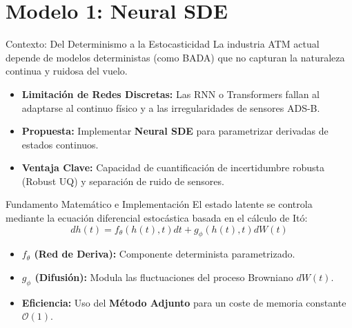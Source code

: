 \documentclass[aspectratio=169]{beamer}
\begin{document}
\section{Modelo 1: Neural SDE}

\begin{frame}{Contexto: Del Determinismo a la Estocasticidad}
  La industria ATM actual depende de modelos deterministas (como BADA) que no capturan la naturaleza continua y ruidosa del vuelo.
  \begin{itemize}
    \item \textbf{Limitación de Redes Discretas:} Las RNN o Transformers fallan al adaptarse al continuo físico y a las irregularidades de sensores ADS-B.
    \item \textbf{Propuesta:} Implementar \textbf{Neural SDE} para parametrizar derivadas de estados continuos.
    \item \textbf{Ventaja Clave:} Capacidad de cuantificación de incertidumbre robusta (Robust UQ) y separación de ruido de sensores.
  \end{itemize}
\end{frame}

\begin{frame}{Fundamento Matemático e Implementación}
  El estado latente se controla mediante la ecuación diferencial estocástica basada en el cálculo de Itó:
  \begin{equation}
    dh(t) = f_{\theta}(h(t),t)dt + g_{\phi}(h(t),t)dW(t)
  \end{equation}
  \begin{itemize}
    \item \textbf{$f_{\theta}$ (Red de Deriva):} Componente determinista parametrizado.
    \item \textbf{$g_{\phi}$ (Difusión):} Modula las fluctuaciones del proceso Browniano $dW(t)$.
    \item \textbf{Eficiencia:} Uso del \textbf{Método Adjunto} para un coste de memoria constante $\mathcal{O}(1)$.
  \end{itemize}
\end{frame}
\end{document}
